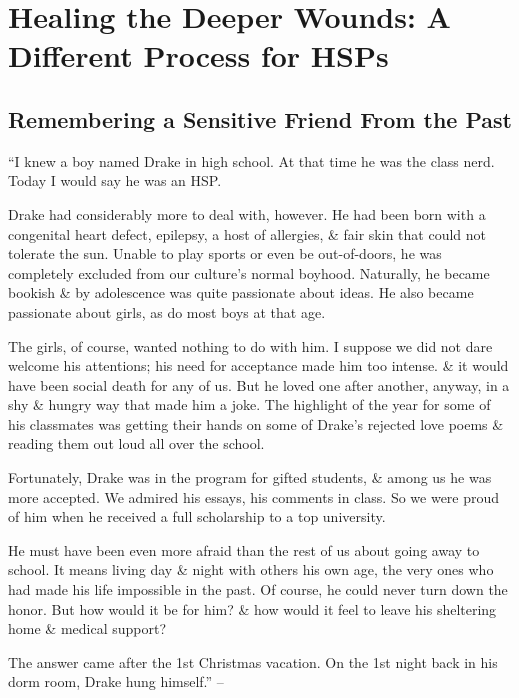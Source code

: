 \documentclass{article}
\numberwithin{equation}{section}
\begin{document}

\section{Healing the Deeper Wounds: A Different Process for HSPs}

\subsection{Remembering a Sensitive Friend From the Past}
``I knew a boy named Drake in high school. At that time he was the class nerd. Today I would say he was an HSP.

Drake had considerably more to deal with, however. He had been born with a congenital heart defect, epilepsy, a host of allergies, \& fair skin that could not tolerate the sun. Unable to play sports or even be out-of-doors, he was completely excluded from our culture's normal boyhood. Naturally, he became bookish \& by adolescence was quite passionate about ideas. He also became passionate about girls, as do most boys at that age.

The girls, of course, wanted nothing to do with him. I suppose we did not dare welcome his attentions; his need for acceptance made him too intense. \& it would have been social death for any of us. But he loved one after another, anyway, in a shy \& hungry way that made him a joke. The highlight of the year for some of his classmates was getting their hands on some of Drake's rejected love poems \& reading them out loud all over the school.

Fortunately, Drake was in the program for gifted students, \& among us he was more accepted. We admired his essays, his comments in class. So we were proud of him when he received a full scholarship to a top university.

He must have been even more afraid than the rest of us about going away to school. It means living day \& night with others his own age, the very ones who had made his life impossible in the past. Of course, he could never turn down the honor. But how would it be for him? \& how would it feel to leave his sheltering home \& medical support?

The answer came after the 1st Christmas vacation. On the 1st night back in his dorm room, Drake hung himself.'' -- \cite[p. 198]{Aron2013}
\end{document}
